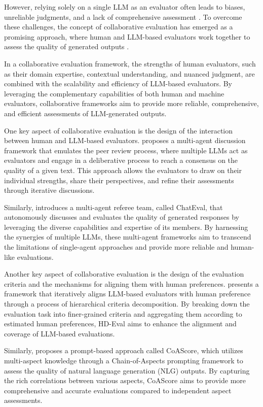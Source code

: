 \documentclass[11pt]{article}
\begin{document}
However, relying solely on a single LLM as an evaluator often leads to biases, unreliable judgments, and a lack of comprehensive assessment \cite{ref130}. To overcome these challenges, the concept of collaborative evaluation has emerged as a promising approach, where human and LLM-based evaluators work together to assess the quality of generated outputs \cite{ref66}.

In a collaborative evaluation framework, the strengths of human evaluators, such as their domain expertise, contextual understanding, and nuanced judgment, are combined with the scalability and efficiency of LLM-based evaluators. By leveraging the complementary capabilities of both human and machine evaluators, collaborative frameworks aim to provide more reliable, comprehensive, and efficient assessments of LLM-generated outputs.

One key aspect of collaborative evaluation is the design of the interaction between human and LLM-based evaluators. \cite{ref131} proposes a multi-agent discussion framework that emulates the peer review process, where multiple LLMs act as evaluators and engage in a deliberative process to reach a consensus on the quality of a given text. This approach allows the evaluators to draw on their individual strengths, share their perspectives, and refine their assessments through iterative discussions.

Similarly, \cite{ref132} introduces a multi-agent referee team, called ChatEval, that autonomously discusses and evaluates the quality of generated responses by leveraging the diverse capabilities and expertise of its members. By harnessing the synergies of multiple LLMs, these multi-agent frameworks aim to transcend the limitations of single-agent approaches and provide more reliable and human-like evaluations.

Another key aspect of collaborative evaluation is the design of the evaluation criteria and the mechanisms for aligning them with human preferences. \cite{ref78} presents a framework that iteratively aligns LLM-based evaluators with human preference through a process of hierarchical criteria decomposition. By breaking down the evaluation task into finer-grained criteria and aggregating them according to estimated human preferences, HD-Eval aims to enhance the alignment and coverage of LLM-based evaluations.

Similarly, \cite{ref133} proposes a prompt-based approach called CoAScore, which utilizes multi-aspect knowledge through a Chain-of-Aspects prompting framework to assess the quality of natural language generation (NLG) outputs. By capturing the rich correlations between various aspects, CoAScore aims to provide more comprehensive and accurate evaluations compared to independent aspect assessments.
\end{document}
